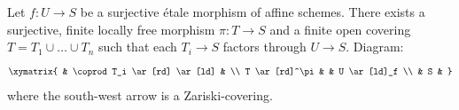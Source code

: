 \begin{lemma}
\label{lemma-dominate-etale-affine-finite-flat}
Let $f : U \to S$ be a surjective \'etale morphism of affine schemes.
There exists a surjective, finite locally free morphism
$\pi : T \to S$ and a finite open covering
$T = T_1 \cup \ldots \cup T_n$ such that each
$T_i \to S$ factors through $U \to S$. Diagram:
$$
\xymatrix{
& \coprod T_i  \ar[rd] \ar[ld] & \\
T \ar[rd]^\pi & & U \ar[ld]_f \\
& S &
}
$$
where the south-west arrow is a Zariski-covering.
\end{lemma}